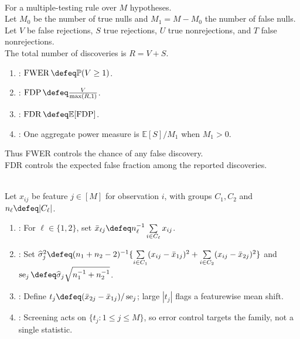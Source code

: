 \begin{definition} \label{def:false-discovery-rate} \\
For a multiple-testing rule over $M$ hypotheses.\\
Let $M_0$ be the number of true nulls and $M_1=M-M_0$ the number of false nulls.\\
Let $V$ be false rejections, $S$ true rejections, $U$ true nonrejections, and $T$ false nonrejections.\\
The total number of discoveries is $R=V+S$.
\begin{enumerate}[label=(\roman*)]
\setlength{\itemsep}{0pt}
\item {}: $\operatorname{FWER}\defeq\mathbb{P}(V\geq1)$.
\item {}: $\operatorname{FDP}\defeq\frac{V}{\max(R,1)}$.
\item {}: $\operatorname{FDR}\defeq\mathbb{E}[\operatorname{FDP}]$.
\item {}: One aggregate power measure is $\mathbb{E}[S]/M_1$ when $M_1>0$.
\end{enumerate}
Thus FWER controls the chance of any false discovery.\\
FDR controls the expected false fraction among the reported discoveries.
\end{definition}

\begin{method} \label{meth:featurewise-two-sample-high-dimensional-screening} \\
Let $x_{ij}$ be feature $j\in[M]$ for observation $i$, with groups $C_1,C_2$ and $n_\ell\defeq|C_\ell|$.
\begin{enumerate}[label=(\roman*)]
\setlength{\itemsep}{0pt}
\item {}: For $\ell\in\{1,2\}$, set $\bar{x}_{\ell j}\defeq n_\ell^{-1}\sum\limits_{i\in C_\ell}x_{ij}$.
\item {}: Set $\widehat{\sigma}_j^2\defeq(n_1+n_2-2)^{-1}\{\sum\limits_{i\in C_1}(x_{ij}-\bar{x}_{1j})^2+\sum\limits_{i\in C_2}(x_{ij}-\bar{x}_{2j})^2\}$ and $\operatorname{se}_j\defeq\widehat{\sigma}_j\sqrt{n_1^{-1}+n_2^{-1}}$.
\item {}: Define $t_j\defeq(\bar{x}_{2j}-\bar{x}_{1j})/\operatorname{se}_j$; large $|t_j|$ flags a featurewise mean shift.
\item {}: Screening acts on $\{t_j:1\leq j\leq M\}$, so error control targets the family, not a single statistic.
\end{enumerate}
\end{method}

